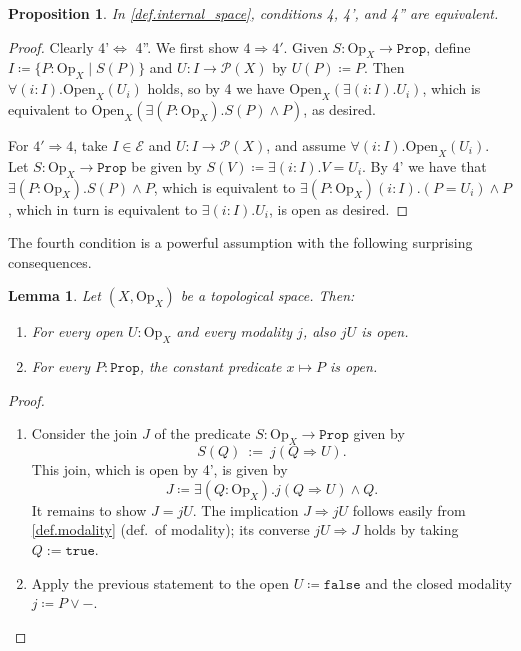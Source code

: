 \documentclass[11pt, oneside, article]{memoir}
\theoremstyle{plain}
\newtheorem{proposition}[theorem]{Proposition}
\newtheorem{lemma}[theorem]{Lemma}
\theoremstyle{definition}
\theoremstyle{remark}
\newcommand{\const}[1]{\mathtt{#1}}
\newcommand{\Set}[1]{\mathrm{#1}}
\newcommand{\cat}[1]{\mathcal{#1}}
\newcommand{\pow}{\mathcal{P}}
\newcommand{\prop}{\const{Prop}}
\newcommand{\Op}{\Set{Op}}
\newcommand{\Open}{\Set{Open}}
\newcommand{\imp}{\Rightarrow}
\renewcommand{\iff}{\Leftrightarrow}
\newcommand{\true}{\const{true}}
\newcommand{\false}{\const{false}}
\begin{document}
\begin{proposition}
In \cref{def.internal_space}, conditions 4, 4', and 4'' are equivalent.
\end{proposition}
\begin{proof}
Clearly 4'$\iff$ 4''. We first show $4\imp 4'$. Given $S\colon\Op_X\to\prop$, define $I\coloneqq\{P:\Op_X\mid S(P)\}$ and $U\colon I\to\pow(X)$ by $U(P)\coloneqq P$. Then $\forall(i:I).\Open_X(U_i)$ holds, so by 4 we have $\Open_X(\exists(i:I).U_i)$, which is equivalent to $\Open_X(\exists(P:\Op_X).S(P)\wedge P)$, as desired.

For $4'\imp 4$, take $I\in\cat{E}$ and $U\colon I\to\pow(X)$, and assume $\forall(i:I).\Open_X(U_i)$. Let $S\colon\Op_X\to\prop$ be given by $S(V)\coloneqq\exists(i:I).V=U_i$. By 4' we have that $\exists(P:\Op_X).S(P)\wedge P$, which is equivalent to $\exists(P:\Op_X)(i:I).(P=U_i)\wedge P$, which in turn is equivalent to $\exists(i:I).U_i$, is open as desired.
\end{proof}

The fourth condition is a powerful assumption with the following surprising consequences.

\begin{lemma}
	\label{props_open}
	Let $(X,\Op_X)$ be a topological space. Then:
	\begin{enumerate}
		\item For every open $U : \Op_X$ and every modality $j$, also $jU$ is open.
		\item For every $P : \prop$, the constant predicate $x \mapsto P$ is open.
	\end{enumerate}
\end{lemma}

\begin{proof}
	\begin{enumerate}
		\item Consider the join $J$ of the predicate $S : \Op_X \to \prop$ given by
			\[
				S(Q) \: := \: j(Q \Rightarrow U).
			\]
			This join, which is open by 4', is given by
			\[
				J\coloneqq\exists(Q : \Op_X) . j(Q \Rightarrow U) \land Q.
			\]
			It remains to show $J=jU$. The implication $J\imp jU$ follows easily from \cref{def.modality} (def.\ of modality); its converse $jU\imp J$ holds by taking $Q := \true$.
		\item Apply the previous statement to the open $U\coloneqq\false$ and the closed modality $j\coloneqq P \lor -$. \qedhere
	\end{enumerate}
\end{proof}
\end{document}
